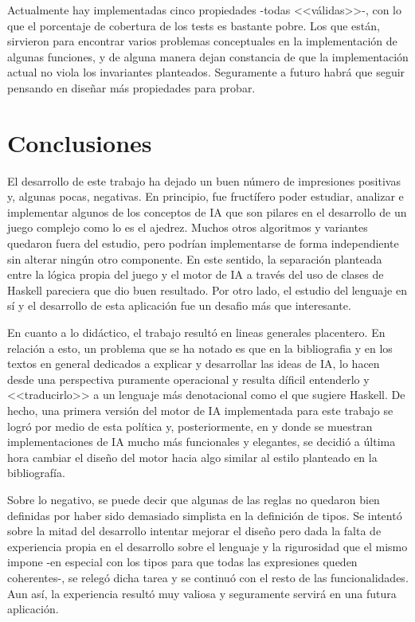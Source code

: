 \documentclass{llncs}
\begin{document}
Actualmente hay implementadas cinco propiedades -todas <<válidas>>-, con lo que el porcentaje de cobertura de los tests es bastante pobre. Los que están, sirvieron para encontrar varios problemas conceptuales en la implementación de algunas funciones, y de alguna manera dejan constancia de que la implementación actual no viola los invariantes planteados. Seguramente a futuro habrá que seguir pensando en diseñar más propiedades para probar.

\section{Conclusiones}

El desarrollo de este trabajo ha dejado un buen número de impresiones positivas y, algunas pocas, negativas. En principio, fue fructífero poder estudiar, analizar e implementar algunos de los conceptos de IA que son pilares en el desarrollo de un juego complejo como lo es el ajedrez. Muchos otros algoritmos y variantes quedaron fuera del estudio, pero podrían implementarse de forma independiente sin alterar ningún otro componente. En este sentido, la separación planteada entre la lógica propia del juego y el motor de IA a través del uso de clases de Haskell pareciera que dio buen resultado. Por otro lado, el estudio del lenguaje en sí y el desarrollo de esta aplicación fue un desafio más que interesante.

En cuanto a lo didáctico, el trabajo resultó en lineas generales placentero. En relación a esto, un problema que se ha notado es que en la bibliografia y en los textos en general dedicados a explicar y desarrollar las ideas de IA, lo hacen desde una perspectiva puramente operacional y resulta díficil entenderlo y <<traducirlo>> a un lenguaje más denotacional como el que sugiere Haskell. De hecho, una primera versión del motor de IA implementada para este trabajo se logró por medio de esta política y, posteriormente, en \cite{whyfunctional} y \cite{introfunctional} donde se muestran implementaciones de IA mucho más funcionales y elegantes, se decidió a última hora cambiar el diseño del motor hacia algo similar al estilo planteado en la bibliografía.

Sobre lo negativo, se puede decir que algunas de las reglas no quedaron bien definidas por haber sido demasiado simplista en la definición de tipos. Se intentó sobre la mitad del desarrollo intentar mejorar el diseño pero dada la falta de experiencia propia en el desarrollo sobre el lenguaje y la rigurosidad que el mismo impone -en especial con los tipos para que todas las expresiones queden coherentes-, se relegó dicha tarea y se continuó con el resto de las funcionalidades. Aun así, la experiencia resultó muy valiosa y seguramente servirá en una futura aplicación.
\end{document}
